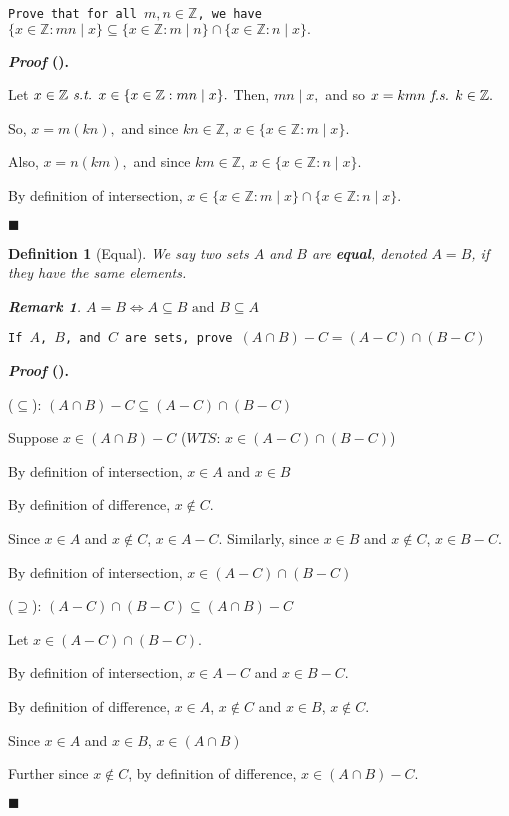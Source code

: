 \documentclass[12pt,a4paper]{article}
\newcounter{nprf}[subsection]
\newtheorem{df}{Definition}[subsection]
\newtheorem*{rmk}{\indent Remark}
\newenvironment*{prf}{\par\indent\textbf{\textit{Proof} (\stepcounter{nprf}\thenprf). }\par}{\par\hfill $\blacksquare$\par}
\def\Z{{\mathbb{Z}}}
\def\st{\emph{ s.t. }}
\def\fs{\emph{ f.s. }}
\def\WTS{\mathit{WTS}}
\begin{document}
\begin{framed}
\noindent\texttt{Prove that for all $m,n\in\Z$, we have $\{x\in\Z: mn\mid x\}\subseteq\{x\in\Z:m\mid n\}\cap\{x\in\Z:n\mid x\}.$}	
\begin{prf}
	Let $x\in\Z\st x\in\{x\in\Z: mn\mid x\}.$ Then, $mn\mid x,$ and so $x=kmn\fs k\in\Z.$\par So, $x=m(kn),$ and since $kn\in\Z$, $x\in\{x\in\Z:m\mid x\}$.\par Also, $x=n(km),$ and since $km\in\Z$, $x\in\{x\in\Z:n\mid x\}$.\par By definition of intersection, $x\in\{x\in\Z:m\mid x\}\cap\{x\in\Z:n\mid x\}$.
\end{prf}
\end{framed}
\begin{df}[Equal]
	We say two sets $A$ and $B$ are \textbf{equal}, denoted $A=B$, if they have the same elements.
	\begin{rmk}
		$A=B\iff A\subseteq B\text{ and }B\subseteq A$	
	\end{rmk}
\end{df}
\begin{framed}
\noindent\texttt{If $A$, $B$, and $C$ are sets, prove $(A\cap B)-C=(A-C)\cap(B-C)$}
\begin{prf}
	($\subseteq$): $(A\cap B)-C\subseteq(A-C)\cap(B-C)$\par Suppose $x\in(A\cap B)-C$ ($\WTS$: $x\in(A-C)\cap(B-C)$)\par By definition of intersection, $x\in A$ and $x\in B$\par By definition of difference, $x\notin C.$\par Since $x\in A$ and $x\notin C$, $x\in A-C$. Similarly, since $x\in B$ and $x\notin C$, $x\in B-C$.\par By definition of intersection, $x\in(A-C)\cap(B-C)$\par
	($\supseteq$): $(A-C)\cap(B-C)\subseteq(A\cap B)-C$\par Let $x\in(A-C)\cap(B-C)$.\par By definition of intersection, $x\in A-C$ and $x\in B-C$.\par By definition of difference, $x\in A$, $x\notin C$ and $x\in B$, $x\notin C$.\par Since $x\in A$ and $x\in B$, $x\in(A\cap B)$\par Further since $x\notin C$, by definition of difference, $x\in(A\cap B)-C.$
\end{prf}
\end{framed}
\end{document}
